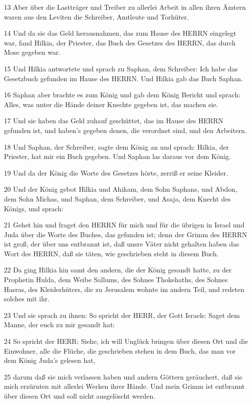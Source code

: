 \par 13 Aber über die Lastträger und Treiber zu allerlei Arbeit in allen ihren Ämtern waren aus den Leviten die Schreiber, Amtleute und Torhüter.
\par 14 Und da sie das Geld herausnahmen, das zum Hause des HERRN eingelegt war, fand Hilkia, der Priester, das Buch des Gesetzes des HERRN, das durch Mose gegeben war.
\par 15 Und Hilkia antwortete und sprach zu Saphan, dem Schreiber: Ich habe das Gesetzbuch gefunden im Hause des HERRN. Und Hilkia gab das Buch Saphan.
\par 16 Saphan aber brachte es zum König und gab dem König Bericht und sprach: Alles, was unter die Hände deiner Knechte gegeben ist, das machen sie.
\par 17 Und sie haben das Geld zuhauf geschüttet, das im Hause des HERRN gefunden ist, und haben's gegeben denen, die verordnet sind, und den Arbeitern.
\par 18 Und Saphan, der Schreiber, sagte dem König an und sprach: Hilkia, der Priester, hat mir ein Buch gegeben. Und Saphan las daraus vor dem König.
\par 19 Und da der König die Worte des Gesetzes hörte, zerriß er seine Kleider.
\par 20 Und der König gebot Hilkia und Ahikam, dem Sohn Saphans, und Abdon, dem Sohn Michas, und Saphan, dem Schreiber, und Asaja, dem Knecht des Königs, und sprach:
\par 21 Gehet hin und fraget den HERRN für mich und für die übrigen in Israel und Juda über die Worte des Buches, das gefunden ist; denn der Grimm des HERRN ist groß, der über uns entbrannt ist, daß unsre Väter nicht gehalten haben das Wort des HERRN, daß sie täten, wie geschrieben steht in diesem Buch.
\par 22 Da ging Hilkia hin samt den andern, die der König gesandt hatte, zu der Prophetin Hulda, dem Weibe Sallums, des Sohnes Thokehaths, des Sohnes Hasras, des Kleiderhüters, die zu Jerusalem wohnte im andern Teil, und redeten solches mit ihr.
\par 23 Und sie sprach zu ihnen: So spricht der HERR, der Gott Israels: Saget dem Manne, der euch zu mir gesandt hat:
\par 24 So spricht der HERR: Siehe, ich will Unglück bringen über diesen Ort und die Einwohner, alle die Flüche, die geschrieben stehen in dem Buch, das man vor dem König Juda's gelesen hat,
\par 25 darum daß sie mich verlassen haben und andern Göttern geräuchert, daß sie mich erzürnten mit allerlei Werken ihrer Hände. Und mein Grimm ist entbrannt über diesen Ort und soll nicht ausgelöscht werden.
